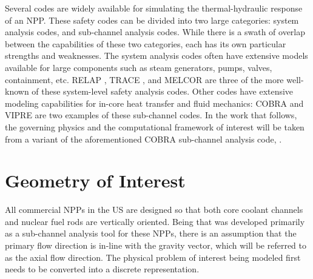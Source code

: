 Several codes are widely available for simulating the thermal-hydraulic response of an NPP.
These safety codes can be divided into two large categories: system analysis codes, and sub-channel analysis codes.
While there is a swath of overlap between the capabilities of these two categories, each has its own particular strengths and weaknesses.
The system analysis codes often have extensive models available for large components such as steam generators, pumps, valves, containment, etc.
RELAP \cite{RELAP}, TRACE \cite{TRACE}, and MELCOR \cite{Summers1994} are three of the more well-known of these system-level safety analysis codes.
Other codes have extensive modeling capabilities for in-core heat transfer and fluid mechanics: COBRA \cite{Thurgood1983c} and VIPRE are two examples of these sub-channel codes.
In the work that follows, the governing physics and the computational framework of interest will be taken from a variant of the aforementioned COBRA sub-channel analysis code, \cobra{}.
\section{Geometry of Interest}
\label{sect:topology}
All commercial NPPs in the US are designed so that both core coolant channels and nuclear fuel rods are vertically oriented.
Being that \cobra{} was developed primarily as a sub-channel analysis tool for these NPPs, there is an assumption that the primary flow direction is in-line with the gravity vector, which will be referred to as the axial flow direction.
The physical problem of interest being modeled first needs to be converted into a discrete representation. 

